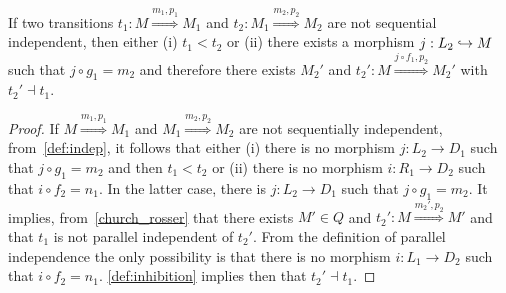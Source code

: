 \begin{lemma}
  \label{lem:not_seq_ind}
  If two transitions $t_1:M\overset{m_1,p_1}{\Rightarrow} M_1$ and $t_2: M_1\overset{m_2,p_2}{\Rightarrow} M_2$ are not sequential independent, then either (i) $t_1 < t_2$ or (ii) there exists a morphism $j:L_2 \hookrightarrow M$ such that $j\circ g_1 = m_2$ and therefore there exists $M_2'$ and $t_2':M\overset{j\circ f_1,p_2}{\Rightarrow} M_2'$ with $t_2'\dashv t_1$.
\end{lemma}
\begin{proof}
  If $M\overset{m_1,p_1}{\Rightarrow} M_1$ and $M_1\overset{m_2,p_2}{\Rightarrow} M_2$ are not sequentially independent, from~\autoref{def:indep}, it follows that either (i) there is no morphism $j:L_2\to D_1$ such that $j\circ g_1= m_2$ and then $t_1 < t_2$ or
(ii) there is no morphism $i:R_1\to D_2$ such that $i\circ f_2= n_1$. In the latter case, there is $j:L_2\to D_1$ such that $j\circ g_1= m_2$. It implies, from~\autoref{church_rosser} that there exists $M'\in Q$ and $t_2':M\overset{m_2',p_2}{\Rightarrow} M'$ and that $t_1$ is not parallel independent of $t_2'$. From the definition of parallel independence the only possibility is that there is no morphism $i:L_1\to D_2$ such that $i\circ f_2= n_1$. \autoref{def:inhibition} implies then that $t_2'\dashv t_1$.
\end{proof}


